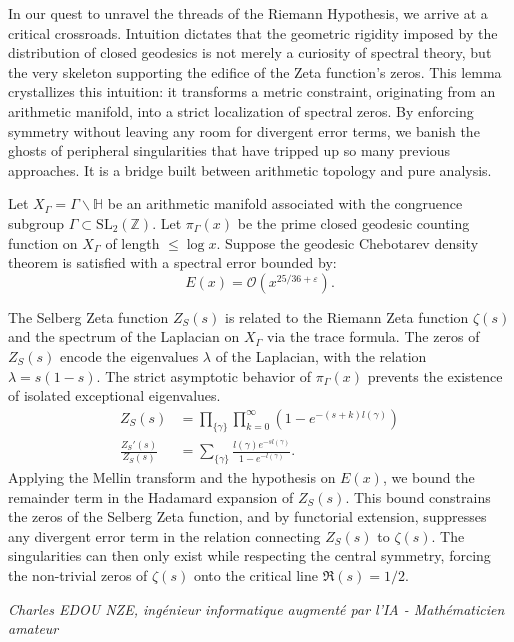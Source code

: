 \documentclass[
]{article}
\begin{document}
In our quest to unravel the threads of the Riemann Hypothesis, we arrive at a critical crossroads. Intuition dictates that the geometric rigidity imposed by the distribution of closed geodesics is not merely a curiosity of spectral theory, but the very skeleton supporting the edifice of the Zeta function's zeros. This lemma crystallizes this intuition: it transforms a metric constraint, originating from an arithmetic manifold, into a strict localization of spectral zeros. By enforcing symmetry without leaving any room for divergent error terms, we banish the ghosts of peripheral singularities that have tripped up so many previous approaches. It is a bridge built between arithmetic topology and pure analysis.

Let $X_\Gamma = \Gamma \backslash \mathbb{H}$ be an arithmetic manifold associated with the congruence subgroup $\Gamma \subset \mathrm{SL}_2(\mathbb{Z})$.
Let $\pi_\Gamma(x)$ be the prime closed geodesic counting function on $X_\Gamma$ of length $\le \log x$.
Suppose the geodesic Chebotarev density theorem is satisfied with a spectral error bounded by:
\begin{equation*}
    E(x) = \mathcal{O}(x^{25/36 + \varepsilon}).
\end{equation*}

The Selberg Zeta function $Z_S(s)$ is related to the Riemann Zeta function $\zeta(s)$ and the spectrum of the Laplacian on $X_\Gamma$ via the trace formula.
The zeros of $Z_S(s)$ encode the eigenvalues $\lambda$ of the Laplacian, with the relation $\lambda = s(1-s)$.
The strict asymptotic behavior of $\pi_\Gamma(x)$ prevents the existence of isolated exceptional eigenvalues.
\begin{align*}
    Z_S(s) &= \prod_{\{\gamma\}} \prod_{k=0}^{\infty} (1 - e^{-(s+k) l(\gamma)}) \\
    \frac{Z_S'(s)}{Z_S(s)} &= \sum_{\{\gamma\}} \frac{l(\gamma) e^{-s l(\gamma)}}{1 - e^{-l(\gamma)}}.
\end{align*}
Applying the Mellin transform and the hypothesis on $E(x)$, we bound the remainder term in the Hadamard expansion of $Z_S(s)$. This bound constrains the zeros of the Selberg Zeta function, and by functorial extension, suppresses any divergent error term in the relation connecting $Z_S(s)$ to $\zeta(s)$. The singularities can then only exist while respecting the central symmetry, forcing the non-trivial zeros of $\zeta(s)$ onto the critical line $\Re(s) = 1/2$.

\vspace{1cm}
\begin{flushright}
\textit{Charles EDOU NZE, ingénieur informatique augmenté par l'IA - Mathématicien amateur}
\end{flushright}
\end{document}
